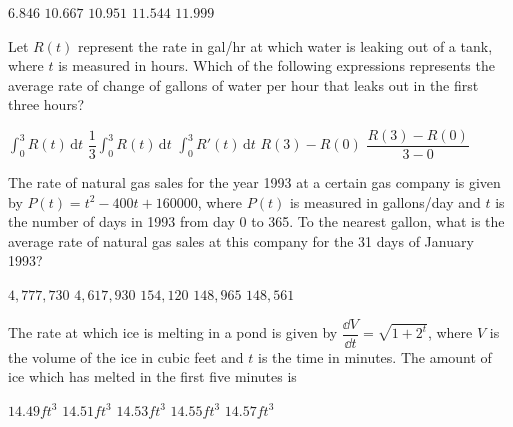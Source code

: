 \begin{questions}
    \begin{oneparchoices}
        \choice $6.846$
        \choice $10.667$
        \choice $10.951$
        \choice $11.544$
        \choice $11.999$
    \end{oneparchoices} \par \horizontalline

    \question Let $R(t)$ represent the rate in gal/hr at which water is leaking out of a tank, where $t$ is measured in hours. Which of the following expressions represents the average rate of change of gallons of water per hour that leaks out in the first three hours? \\

    \begin{oneparchoices}
        \choice $\int_0^3 R(t) \,\mathrm{d}t$
        \choice $\dfrac{1}{3}\int_0^3 R(t) \,\mathrm{d}t$
        \choice $\int_0^3 R'(t) \,\mathrm{d}t$
        \choice $R(3) - R(0)$
        \choice $\dfrac{R(3) - R(0)}{3 - 0}$
    \end{oneparchoices} \par \horizontalline

    \question The rate of natural gas sales for the year 1993 at a certain gas company is given by $P(t) = t^2 - 400t + 160000$, where $P(t)$ is measured in gallons/day and $t$ is the number of days in 1993 from day 0 to 365. To the nearest gallon, what is the average rate of natural gas sales at this company for the 31 days of January 1993? \\
    
    \begin{oneparchoices}
        \choice $4,777,730$
        \choice $4,617,930$
        \choice $154,120$
        \choice $148,965$
        \choice $148,561$
    \end{oneparchoices} \par \horizontalline 

    \question The rate at which ice is melting in a pond is given by $\dfrac{\dd V}{\dd t} = \sqrt{1 + 2^t}$, where $V$ is the volume of the ice in cubic feet and $t$ is the time in minutes. The amount of ice which has melted in the first five minutes is \\

    \begin{oneparchoices}
        \choice $14.49 \si{ft^3}$
        \choice $14.51 \si{ft^3}$
        \choice $14.53 \si{ft^3}$
        \choice $14.55 \si{ft^3}$
        \choice $14.57 \si{ft^3}$
    \end{oneparchoices} \par \horizontalline


\end{questions}
